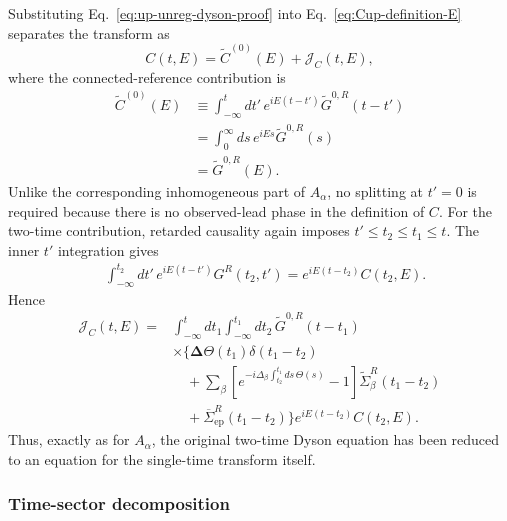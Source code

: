 \documentclass[
 reprint,
 superscriptaddress,
 amsmath,amssymb,
 aps,prb,
 longbibliography,
 floatfix
]{revtex4-2}
\newcommand{\ep}{\mathrm{ep}}
\newcommand{\barSigma}{\overline{\Sigma}}
\begin{document}
Substituting Eq.~\eqref{eq:up-unreg-dyson-proof} into Eq.~\eqref{eq:Cup-definition-E} separates the transform as
\begin{equation*}
C(t,E)
=
\widetilde C^{(0)}(E)
+
\mathcal J_C(t,E),
\end{equation*}
where the connected-reference contribution is
\begin{equation*}
\begin{aligned}
\widetilde C^{(0)}(E)
&\equiv
\int_{-\infty}^{t}dt'\,
e^{iE(t-t')}
\widetilde G^{0,R}(t-t')
\\
&=
\int_0^\infty ds\,
e^{iEs}\widetilde G^{0,R}(s)
\\
&=
\widetilde G^{0,R}(E).
\end{aligned}
\end{equation*}
Unlike the corresponding inhomogeneous part of $A_\alpha$, no splitting at $t'=0$ is required because there is no observed-lead phase in the definition of $C$. For the two-time contribution, retarded causality again imposes $t'\le t_2\le t_1\le t$. The inner $t'$ integration gives
\begin{equation*}
\begin{aligned}
&\int_{-\infty}^{t_2}dt'\,
e^{iE(t-t')}
G^R(t_2,t')
=
e^{iE(t-t_2)}
C(t_2,E).
\end{aligned}
\end{equation*}
Hence
\begin{equation*}
\begin{aligned}
\mathcal J_C(t,E)
={}&
\int_{-\infty}^{t}dt_1
\int_{-\infty}^{t_1}dt_2\,
\widetilde G^{0,R}(t-t_1)
\\
&\times
\Bigg\{
\bm\Delta\Theta(t_1)\delta(t_1-t_2)
\\
&\quad+
\sum_\beta
\left[
e^{-i\Delta_\beta
\int_{t_2}^{t_1}ds\,\Theta(s)}
-1
\right]
\widetilde\Sigma_\beta^R(t_1-t_2)
\\
&\quad+
\barSigma_{\ep}^R(t_1-t_2)
\Bigg\}
e^{iE(t-t_2)}
C(t_2,E).
\end{aligned}
\end{equation*}
Thus, exactly as for $A_\alpha$, the original two-time Dyson equation has been reduced to an equation for the single-time transform itself.

\subsubsection{Time-sector decomposition}
\end{document}
